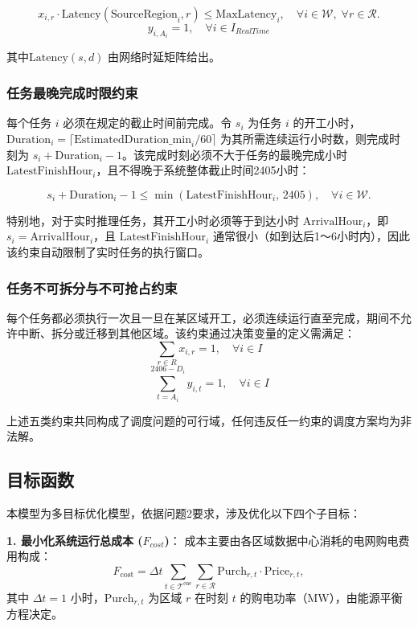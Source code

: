 \documentclass[UTF8,a4paper,zihao=-4]{ctexart}
\begin{document}
\[
x_{i,r} \cdot \mathrm{Latency}(\mathrm{SourceRegion}_i, r) \leq \mathrm{MaxLatency}_i, \quad \forall i \in \mathcal{W},\; \forall r \in \mathcal{R}.
\]
$$
y_{i, A_i} = 1, \quad \forall i \in I_{RealTime}
$$

其中\(\mathrm{Latency}(s,d)\) 由网络时延矩阵给出。

\subsubsection{任务最晚完成时限约束}
每个任务 \(i\) 必须在规定的截止时间前完成。令 \(s_i\) 为任务 \(i\) 的开工小时，\(\mathrm{Duration}_i = \lceil \mathrm{EstimatedDuration\_min}_i / 60 \rceil\) 为其所需连续运行小时数，则完成时刻为 \(s_i + \mathrm{Duration}_i - 1\)。该完成时刻必须不大于任务的最晚完成小时 \(\mathrm{LatestFinishHour}_i\)，且不得晚于系统整体截止时间2405小时：

\[
s_i + \mathrm{Duration}_i - 1 \leq \min(\mathrm{LatestFinishHour}_i,\, 2405), \quad \forall i \in \mathcal{W}.
\]

特别地，对于实时推理任务，其开工小时必须等于到达小时 \(\mathrm{ArrivalHour}_i\)，即 \(s_i = \mathrm{ArrivalHour}_i\)，且 \(\mathrm{LatestFinishHour}_i\) 通常很小（如到达后1～6小时内），因此该约束自动限制了实时任务的执行窗口。

\subsubsection{任务不可拆分与不可抢占约束}
每个任务都必须执行一次且一旦在某区域开工，必须连续运行直至完成，期间不允许中断、拆分或迁移到其他区域。该约束通过决策变量的定义需满足：
$$
\sum_{r \in R} x_{i, r} = 1, \quad \forall i \in I
$$
$$
\sum_{t = A_i}^{2406 - D_i} y_{i, t} = 1, \quad \forall i \in I
$$

上述五类约束共同构成了调度问题的可行域，任何违反任一约束的调度方案均为非法解。


\subsection{目标函数}

本模型为多目标优化模型，依据问题2要求，涉及优化以下四个子目标：

\textbf{1. 最小化系统运行总成本 ($F_{cost}$)}：
成本主要由各区域数据中心消耗的电网购电费用构成：
\[
F_{\text{cost}} = \Delta t \sum_{t \in \mathcal{T}^{\text{ene}}} \sum_{r \in \mathcal{R}} \text{Purch}_{r,t} \cdot \text{Price}_{r,t},
\]
其中 $\Delta t = 1$ 小时，$\text{Purch}_{r,t}$ 为区域 $r$ 在时刻 $t$ 的购电功率（MW），由能源平衡方程决定。
\end{document}
